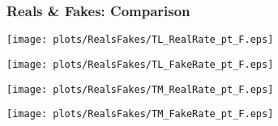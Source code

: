 	\begin{frame}
	\frametitle{Reals \& Fakes: Comparison}
	
	\begin{center}
	
	\texttt{[image: plots/RealsFakes/TL\_RealRate\_pt\_F.eps]}
	
	\texttt{[image: plots/RealsFakes/TL\_FakeRate\_pt\_F.eps]}
	
	\end{center}	
	
	
	\begin{center}
	
	\texttt{[image: plots/RealsFakes/TM\_RealRate\_pt\_F.eps]}
	
	\texttt{[image: plots/RealsFakes/TM\_FakeRate\_pt\_F.eps]}
	
	\end{center}	
	
	
	\vspace{30pt}
	
	\cend 
	
\end{frame}
		